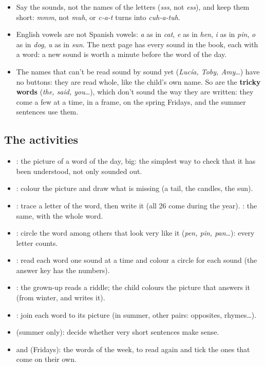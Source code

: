{\small
\begin{itemize}[leftmargin=6mm, itemsep=1pt, topsep=2pt]
\item Say the sounds, not the names of the letters (\textit{sss}, not
  \textit{ess}), and keep them short: \textit{mmm}, not \textit{muh}, or
  \textit{c-a-t} turns into \textit{cuh-a-tuh}.
\item English vowels are not Spanish vowels: \textit{a} as in
  \textit{cat}, \textit{e} as in \textit{hen}, \textit{i} as in
  \textit{pin}, \textit{o} as in \textit{dog}, \textit{u} as in
  \textit{sun}. The next page has every sound in the book, each with a
  word: a new sound is worth a minute before the word of the day.
\item The names that can't be read sound by sound yet (\textit{Lucía,
  Toby, Amy}\ldots) have no buttons: they are read whole, like the
  child's own name. So are the \textbf{tricky words} (\textit{the, said,
  you}\ldots), which don't sound the way they are written: they come a
  few at a time, in a frame, on the spring Fridays, and the summer
  sentences use them.
\end{itemize}}

\subsection*{The activities}

{\small
\begin{itemize}[leftmargin=6mm, itemsep=1pt, topsep=2pt]
\item \textbf{\lblColorea}: the picture of a word of the day, big: the
  simplest way to check that it has been understood, not only sounded out.
\item \textbf{\lblCompleta}: colour the picture and draw what is missing
  (a tail, the candles, the sun).
\item \textbf{\lblTraza}: trace a letter of the word, then write it (all
  26 come during the year). \textbf{\lblEscribe}: the same, with the
  whole word.
\item \textbf{\lblEncuentra}: circle the word among others that look
  very like it (\textit{pen, pin, pan}\ldots): every letter counts.
\item \textbf{\lblPalmadas}: read each word one sound at a time and
  colour a circle for each sound (the answer key has the numbers).
\item \textbf{\lblAdivina}: the grown-up reads a riddle; the child
  colours the picture that answers it (from winter, and writes it).
\item \textbf{\lblUne}: join each word to its picture (in summer, other
  pairs: opposites, rhymes\ldots).
\item \textbf{\lblSiNo} (summer only): decide whether very short
  sentences make sense.
\item \textbf{\lblRelee} and \textbf{\lblRepasa} (Fridays): the words of
  the week, to read again and tick the ones that come on their own.
\end{itemize}}

